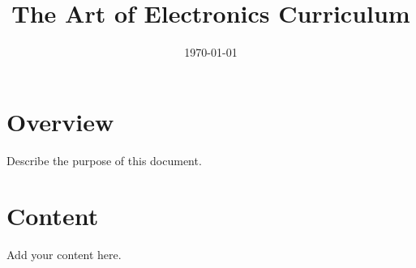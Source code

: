 \documentclass[11pt]{article}
\title{The Art of Electronics Curriculum}
\author{}
\date{\today}
\begin{document}
\maketitle

\section{Overview}
Describe the purpose of this document.

\section{Content}
Add your content here.
\end{document}
